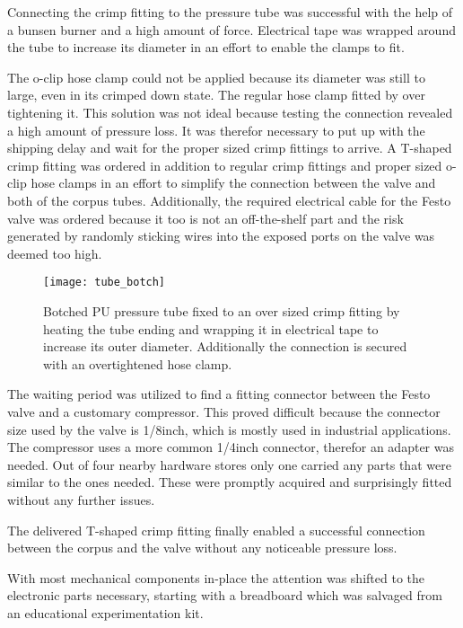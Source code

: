 Connecting the crimp fitting to the pressure tube was successful with the help of a bunsen burner and a high amount of force. Electrical tape was wrapped around the tube to increase its diameter in an effort to enable the clamps to fit.

The o-clip hose clamp could not be applied because its diameter was still to large, even in its crimped down state. The regular hose clamp fitted by over tightening it. This solution was not ideal because testing the connection revealed a high amount of pressure loss. It was therefor necessary to put up with the shipping delay and wait for the proper sized crimp fittings to arrive. A T-shaped crimp fitting was ordered in addition to regular crimp fittings and proper sized o-clip hose clamps in an effort to simplify the connection between the valve and both of the corpus tubes. Additionally, the required electrical cable for the Festo valve was ordered because it too is not an off-the-shelf part and the risk generated by randomly sticking wires into the exposed ports on the valve was deemed too high.

\begin{figure}[H]
\centering

\texttt{[image: tube\_botch]}

\caption{Botched PU pressure tube fixed to an over sized crimp fitting by heating the tube ending and wrapping it in electrical tape to increase its outer diameter. Additionally the connection is secured with an overtightened hose clamp.}
\end{figure}

The waiting period was utilized to find a fitting connector between the Festo valve and a customary compressor. This proved difficult because the connector size used by the valve is 1/8inch, which is mostly used in industrial applications. The compressor uses a more common 1/4inch connector, therefor an adapter was needed. Out of four nearby hardware stores only one carried any parts that were similar to the ones needed. These were promptly acquired and surprisingly fitted without any further issues.

The delivered T-shaped crimp fitting finally enabled a successful connection between the corpus and the valve without any noticeable pressure loss.  

With most mechanical components in-place the attention was shifted to the electronic parts necessary, starting with a breadboard which was salvaged from an educational experimentation kit. 

